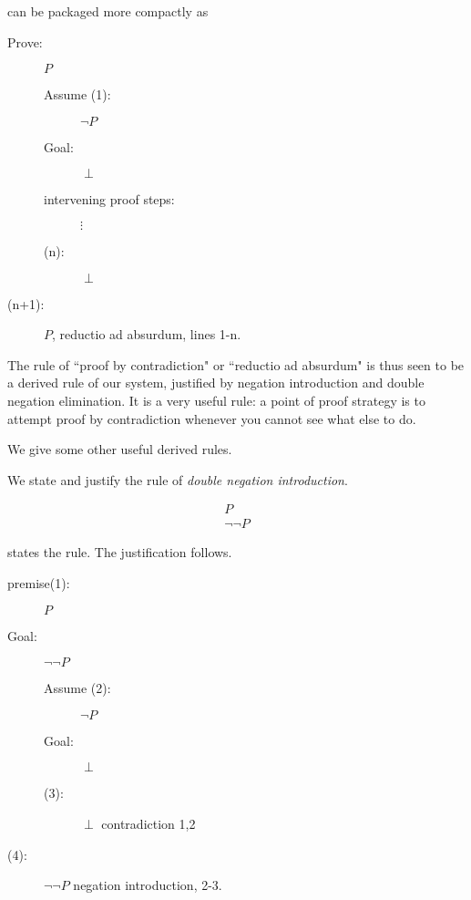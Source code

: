 \documentclass[12pt]{article}
\begin{document}
can be packaged more compactly as 


\begin{description}

\item[Prove:]  $P$

\begin{description}

\item[Assume (1):]  $\neg P$

\item[Goal:]  $\perp$

\item[intervening proof steps:]  $\vdots$

\item[(n):]  $\perp$



\end{description}

\item[(n+1):]  $P$, reductio ad absurdum, lines 1-n.


\end{description}

The rule of ``proof by contradiction" or ``reductio ad absurdum" is thus seen to be a derived rule of our system, justified by negation introduction and double negation elimination.  It is a very useful rule:  a point of proof strategy is to attempt proof by contradiction whenever you cannot see what else to do.

We give some other useful derived rules.

We state and justify the rule of {\em double negation introduction\/}.

$$\begin{array}{c}

P \\ \hline

\neg \neg P

\end{array}$$

states the rule.  The justification follows.

\begin{description}

\item[premise(1):]  $P$

\item[Goal:]  $\neg\neg P$

\begin{description}

\item[Assume (2):]  $\neg P$

\item[Goal:]  $\perp$

\item[(3):]  $\perp$ contradiction 1,2


\end{description}

\item[(4):]  $\neg \neg P$ negation introduction, 2-3.

\end{description}
\end{document}
